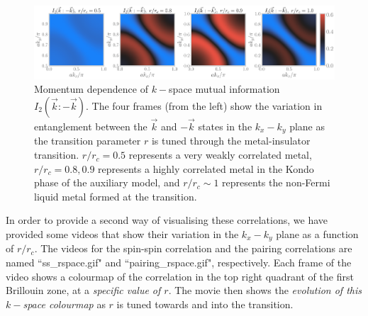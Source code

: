 \documentclass[prb]{revtex4-2}
\begin{document}
\begin{figure}[!htb]
\includegraphics[width=\textwidth]{mutinfo_kspace_all.pdf}
\caption{Momentum dependence of \(k-\)space mutual information \(I_2(\vec k: -\vec k)\). The four frames (from the left) show the variation in entanglement between the \(\vec k\) and \(-\vec k\) states in the \(k_x-k_y\) plane as the transition parameter \(r\) is tuned through the metal-insulator transition. \(r/r_c=0.5\) represents a very weakly correlated metal, \(r/r_c=0.8,0.9\) represents a highly correlated metal in the Kondo phase of the auxiliary model, and \(r/r_c \sim 1\) represents the non-Fermi liquid metal formed at the transition.}
\label{mutinfo_kspace}
\end{figure}

{\color{blue} In order to provide a second way of visualising these correlations, we have provided some videos that show their variation in the \(k_x-k_y\) plane as a function of \(r/r_c\). The videos for the spin-spin correlation and the pairing correlations are named ``ss\_rspace.gif" and ``pairing\_rspace.gif", respectively. Each frame of the video shows a colourmap of the correlation in the top right quadrant of the first Brillouin zone, at a {\it specific value of \(r\)}. The movie then shows the {\it evolution of this \(k-\)space colourmap} as \(r\) is tuned towards and into the transition.}
\end{document}

